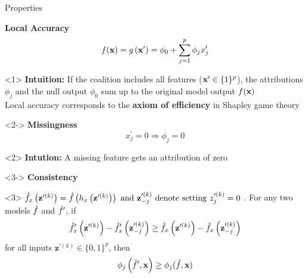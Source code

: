 \documentclass[11pt,compress,t,notes=noshow, aspectratio=169, xcolor=table]{beamer}
\begin{document}







\begin{frame}{Properties}

\textbf{Local Accuracy}
$$
f(\xv)=g\left(\xv^{\prime}\right)=\phi_{0}+\sum_{j=1}^{p} \phi_{j} x_{j}^{\prime}
$$
\begin{onlyenv}<1>
\textbf{Intuition:} If the coalition includes all features ($\xv^{\prime}  \in \{1\}^p $), the attributions $\phi_j$ and the null output $\phi_0$ sum up to the original model output $f(\xv)$\\\medskip
Local accuracy corresponds to the \textbf{axiom of efficiency} in Shapley game theory 

\end{onlyenv}

\begin{onlyenv}<2->
\textbf{Missingness}
$$
x_{j}^{\prime}=0 \Longrightarrow \phi_{j}=0
$$
\end{onlyenv}

\begin{onlyenv}<2>
\textbf{Intution:}  A missing feature gets an attribution of zero
\end{onlyenv}

\begin{onlyenv}<3->
\textbf{Consistency} \\
\end{onlyenv}
\begin{onlyenv}<3>
$\fh_{x}\left(\mathbf{z}^{\prime (k)}\right)=\fh\left(h_{x}\left(\mathbf{z}^{\prime (k)}\right)\right) \text { and } \mathbf{z}^{\prime (k)}_{-j} \text{ denote setting } z_{j}^{\prime (k)}=0$ . For any two
models $\fh$ and $\fh^{\prime}$, if
$$
\fh_{x}^{\prime}\left(\mathbf{z}^{\prime (k)}\right)-\fh_{x}^{\prime}\left(\mathbf{z}^{\prime (k)}_{-j}\right) \geq \fh_{x}\left(\mathbf{z}^{\prime (k)}\right)-\fh_{x}\left(\mathbf{z}^{\prime (k)}_{-j}\right)
$$
for all inputs $\mathbf{z}^{\prime (k)} \in \{0, 1\}^p$, then
$$
\phi_{j}\left(\fh^{\prime}, \mathbf{x}\right) \geq \phi_{j}(\fh, \mathbf{x})
$$
\end{onlyenv}


\end{frame}
\end{document}
